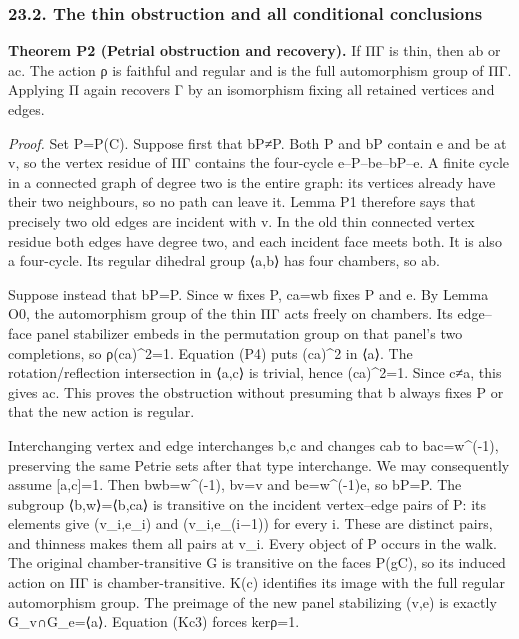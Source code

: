 \documentclass[
  10pt,
  letterpaper,
]{article}
\begin{document}
\subsubsection{23.2. The thin obstruction and all conditional
conclusions}\label{the-thin-obstruction-and-all-conditional-conclusions}

\textbf{Theorem P2 (Petrial obstruction and recovery).} If ΠΓ is thin,
then \textbar ab or \textbar ac. The action ρ is
faithful and regular and is the full automorphism group of ΠΓ. Applying
Π again recovers Γ by an isomorphism fixing all retained vertices and
edges.

\emph{Proof.} Set P=P(C). Suppose first that bP≠P. Both P and bP contain
e and be at v, so the vertex residue of ΠΓ contains the four-cycle
e--P--be--bP--e. A finite cycle in a connected graph of degree two is
the entire graph: its vertices already have their two neighbours, so no
path can leave it. Lemma P1 therefore says that precisely two old edges
are incident with v. In the old thin connected vertex residue both edges
have degree two, and each incident face meets both. It is also a
four-cycle. Its regular dihedral group ⟨a,b⟩ has four chambers, so
\textbar ab.

Suppose instead that bP=P. Since w fixes P, ca=wb fixes P and e. By
Lemma O0, the automorphism group of the thin ΠΓ acts freely on chambers.
Its edge--face panel stabilizer embeds in the permutation group on that
panel's two completions, so ρ(ca)\^{}2=1. Equation (P4) puts (ca)\^{}2
in ⟨a⟩. The rotation/reflection intersection in ⟨a,c⟩ is trivial, hence
(ca)\^{}2=1. Since c≠a, this gives \textbar ac. This proves
the obstruction without presuming that b always fixes P or that the new
action is regular.

Interchanging vertex and edge interchanges b,c and changes cab to
bac=w\^{}(-1), preserving the same Petrie sets after that type
interchange. We may consequently assume {[}a,c{]}=1. Then bwb=w\^{}(-1),
bv=v and be=w\^{}(-1)e, so bP=P. The subgroup ⟨b,w⟩=⟨b,ca⟩ is transitive
on the incident vertex--edge pairs of P: its elements give (v\_i,e\_i)
and (v\_i,e\_(i−1)) for every i. These are distinct pairs, and thinness
makes them all pairs at v\_i. Every object of P occurs in the walk. The
original chamber-transitive G is transitive on the faces P(gC), so its
induced action on ΠΓ is chamber-transitive. K(c) identifies its image
with the full regular automorphism group. The preimage of the new panel
stabilizing (v,e) is exactly G\_v∩G\_e=⟨a⟩. Equation (Kc3) forces
kerρ=1.
\end{document}
